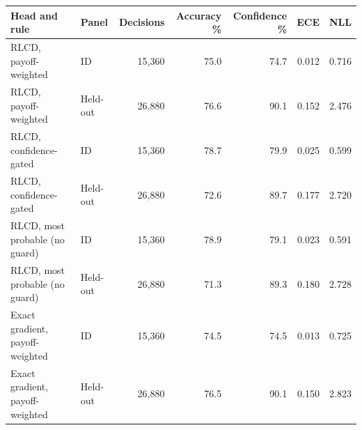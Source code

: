 \begin{tabular}{llrrrrr}
\toprule
Head and rule & Panel & Decisions & Accuracy \% & Confidence \% & ECE & NLL \\
\midrule
RLCD, payoff-weighted & ID & 15{,}360 & 75.0 & 74.7 & 0.012 & 0.716 \\
RLCD, payoff-weighted & Held-out & 26{,}880 & 76.6 & 90.1 & 0.152 & 2.476 \\
RLCD, confidence-gated & ID & 15{,}360 & 78.7 & 79.9 & 0.025 & 0.599 \\
RLCD, confidence-gated & Held-out & 26{,}880 & 72.6 & 89.7 & 0.177 & 2.720 \\
RLCD, most probable (no guard) & ID & 15{,}360 & 78.9 & 79.1 & 0.023 & 0.591 \\
RLCD, most probable (no guard) & Held-out & 26{,}880 & 71.3 & 89.3 & 0.180 & 2.728 \\
Exact gradient, payoff-weighted & ID & 15{,}360 & 74.5 & 74.5 & 0.013 & 0.725 \\
Exact gradient, payoff-weighted & Held-out & 26{,}880 & 76.5 & 90.1 & 0.150 & 2.823 \\
\bottomrule
\end{tabular}
